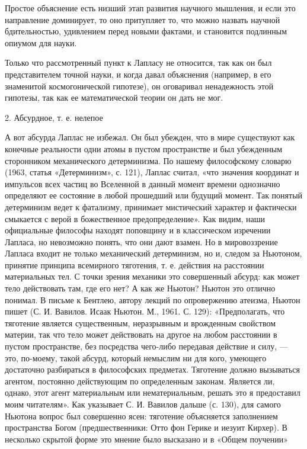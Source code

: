 Простое объяснение есть низший этап развития научного мышления, и если это
направление доминирует, то оно притупляет то, что можно назвать научной
бдительностью, удивлением перед новыми фактами, и становится подлинным опиумом
для науки.

Только что рассмотренный пункт к Лапласу не относится, так как он был
представителем точной науки, и когда давал объяснения (например, в его
знаменитой космогонической гипотезе), он оговаривал ненадежность этой гипотезы,
так как ее математической теории он дать не мог.

2. Абсурдное, т. е. нелепое

А вот абсурда Лаплас не избежал. Он был убежден, что в мире существуют как
конечные реальности одни атомы в пустом пространстве и был убежденным
сторонником механического детерминизма. По нашему философскому словарю (1963,
статья «Детерминизм», с. 121), Лаплас считал, «что значения координат и
импульсов всех частиц во Вселенной в данный момент времени однозначно
определяют ее состояние в любой прошедший или будущий момент. Так понятый
детерминизм ведет к фатализму, принимает мистический характер и фактически
смыкается с верой в божественное предопределение». Как видим, наши официальные
философы находят поповщину и в классическом изречении Лапласа, но невозможно
понять, что они дают взамен. Но в мировоззрение Лапласа входит не только
механический детерминизм, но и, следом за Ньютоном, принятие принципа
всемирного тяготения, т. е. действия на расстоянии материальных тел. С точки
зрения механики это совершенный абсурд: как может тело действовать там, где его
нет? А как же Ньютон? Ньютон это отлично понимал. В письме к Бентлею, автору
лекций по опровержению атеизма, Ньютон пишет (С. И. Вавилов. Исаак Ньютон. М.,
1961. С. 129): «Предполагать, что тяготение является существенным, неразрывным
и врожденным свойством материи, так что тело может действовать на другое на
любом расстоянии в пустом пространстве, без посредства чего-либо передавая
действие и силу, --- это, по-моему, такой абсурд, который немыслим ни для кого,
умеющего достаточно разбираться в философских предметах. Тяготение должно
вызываться агентом, постоянно действующим по определенным законам. Является ли,
однако, этот агент материальным или нематериальным, решать это я предоставил
моим читателям». Как указывает С. И. Вавилов дальше (с. 130), для самого
Ньютона вопрос был совершенно ясен: тяготение объясняется заполнением
пространства Богом (предшественники: Отто фон Герике и иезуит Кирхер). В
несколько скрытой форме это мнение было высказано и в «Общем поучении»
